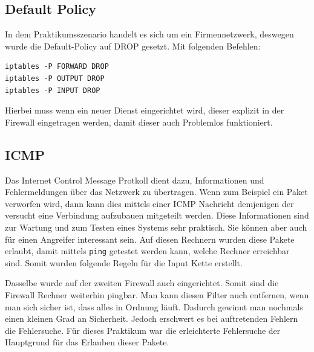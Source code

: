 \subsection{Default Policy}
In dem Praktikumsszenario handelt es sich um ein Firmennetzwerk, deswegen wurde die Default-Policy auf DROP gesetzt. Mit folgenden Befehlen:
\begin{lstlisting}[caption={Befehle für Default Policy}]
iptables -P FORWARD DROP
iptables -P OUTPUT DROP
iptables -P INPUT DROP
\end{lstlisting}
Hierbei muss wenn ein neuer Dienst eingerichtet wird, dieser explizit in der Firewall eingetragen werden, damit dieser auch Problemlos funktioniert.

\subsection{ICMP}
Das Internet Control Message Protkoll dient dazu, Informationen und Fehlermeldungen über das Netzwerk zu übertragen. Wenn zum Beispiel ein Paket verworfen wird, dann kann dies mittels einer ICMP Nachricht demjenigen der versucht eine Verbindung aufzubauen mitgeteilt werden. Diese Informationen sind zur Wartung und zum Testen eines Systems sehr praktisch. Sie können aber auch für einen Angreifer interessant sein. Auf diesen Rechnern wurden diese Pakete erlaubt, damit mittels \texttt{ping} getestet werden kann, welche Rechner erreichbar sind. Somit wurden folgende Regeln für die Input Kette erstellt.

Dasselbe wurde auf der zweiten Firewall auch eingerichtet. Somit sind die Firewall Rechner weiterhin pingbar. Man kann diesen Filter auch entfernen, wenn man sich sicher ist, dass alles in Ordnung läuft. Dadurch gewinnt man nochmals einen kleinen Grad an Sicherheit. Jedoch erschwert es bei auftretenden Fehlern die Fehlersuche. Für dieses Praktikum war die erleichterte Fehlersuche der Hauptgrund für das Erlauben dieser Pakete.

